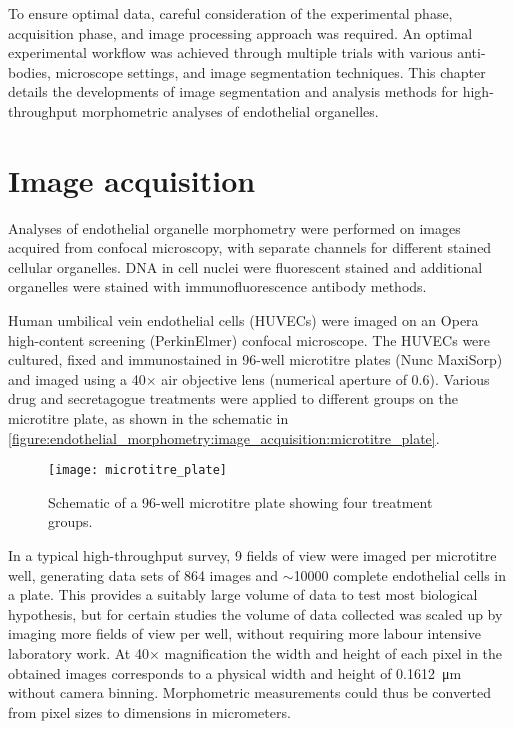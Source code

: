 To ensure optimal data, careful consideration of the experimental phase, acquisition phase, and image processing approach was required. An optimal experimental workflow was achieved through multiple trials with various anti-bodies, microscope settings, and image segmentation techniques. This chapter details the developments of image segmentation and analysis methods for high-throughput morphometric analyses of endothelial organelles.

\section{Image acquisition}
\label{endothelial_morphometry:image_acquisition}
Analyses of endothelial organelle morphometry were performed on images acquired from confocal microscopy, with separate channels for different stained cellular organelles. DNA in cell nuclei were fluorescent stained and additional organelles were stained with immunofluorescence antibody methods.

Human umbilical vein endothelial cells (HUVECs) were imaged on an Opera high-content screening (PerkinElmer) confocal microscope. The HUVECs were cultured, fixed and immunostained in 96-well microtitre plates  (Nunc MaxiSorp) and imaged using a 40$\times$ air objective lens (numerical aperture of 0.6). Various drug and secretagogue treatments were applied to different groups on the microtitre plate, as shown in the schematic in \autoref{figure:endothelial_morphometry:image_acquisition:microtitre_plate}.

\begin{figure}[htbp!]
	\centering
	\texttt{[image: microtitre\_plate]}
	\caption[Microtitre plate layout]{Schematic of a 96-well microtitre plate showing four treatment groups.}
	\label{figure:endothelial_morphometry:image_acquisition:microtitre_plate}
\end{figure}

In a typical high-throughput survey, 9 fields of view were imaged per microtitre well, generating data sets of 864 images and $\sim$10000 complete endothelial cells in a plate. This provides a suitably large volume of data to test most biological hypothesis, but for certain studies the volume of data collected was scaled up by imaging more fields of view per well, without requiring more labour intensive laboratory work. At 40$\times$ magnification the width and height of each pixel in the obtained images corresponds to a physical width and height of \SI{0.1612}{\micro\meter} without camera binning. Morphometric measurements could thus be converted from pixel sizes to dimensions in micrometers.


